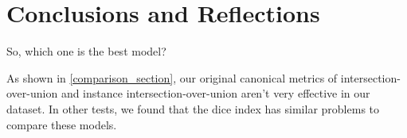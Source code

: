 \section{Conclusions and Reflections}

So, which one is the best model?

As shown in \cref{comparison_section}, our original canonical metrics of intersection-over-union and instance intersection-over-union aren't very effective in our dataset.
In other tests, we found that the dice index has similar problems to compare these models.
